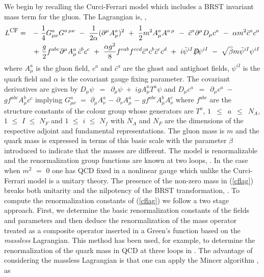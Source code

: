\documentclass[a4paper,11pt]{article}
\newcommand{\Dslash}{D \! \! \! \! /}
\newcommand{\Nf}{N_{\!f}}
\begin{document}
We begin by recalling the Curci-Ferrari model which includes a BRST invariant
mass term for the gluon. The Lagrangian is, \cite{17},  
\begin{eqnarray} 
L^{\mbox{\footnotesize{CF}}} &=& -~ \frac{1}{4} G_{\mu\nu}^a 
G^{a \, \mu\nu} ~-~ \frac{1}{2\alpha} (\partial^\mu A^a_\mu)^2 ~+~ 
\frac{1}{2} m^2 A_\mu^a A^{a \, \mu} ~-~ \bar{c}^a \partial^\mu D_\mu c^a ~-~ 
\alpha m^2 \bar{c}^a c^a \nonumber \\
&& +~ \frac{g}{2} f^{abc} \partial^\mu A^a_\mu \, \bar{c}^b c^c ~+~ 
\frac{\alpha g^2}{8} f^{eab} f^{ecd} \bar{c}^a c^b \bar{c}^c c^d ~+~ 
i \bar{\psi}^{iI} \Dslash \psi^{iI} ~-~ \sqrt{\beta} m \bar{\psi}^{iI} 
\psi^{iI} 
\label{cflag} 
\end{eqnarray}  
where $A^a_\mu$ is the gluon field, $c^a$ and $\bar{c}^a$ are the ghost and 
antighost fields, $\psi^{iI}$ is the quark field and $\alpha$ is the covariant 
gauge fixing parameter. The covariant derivatives are given by 
$D_\mu \psi$~$=$~$\partial_\mu \psi$~$+$~$ig A^a_\mu T^a \psi$ and 
$D_\mu c^a$~$=$~$\partial_\mu c^a$~$-$~$g f^{abc} A^b_\mu c^c$ implying 
$G^a_{\mu\nu}$ $=$ $\partial_\mu A^a_\nu$ $-$ $\partial_\nu A^a_\mu$ $-$ 
$g f^{abc} A^b_\mu A^c_\nu$ where $f^{abc}$ are the structure constants of the
colour group whose generators are $T^a$, $1$~$\leq$~$a$~$\leq$~$N_A$, 
$1$ $\leq$ $I$ $\leq$ $N_F$ and $1$ $\leq$ $i$ $\leq$ $\Nf$ with $N_A$ and 
$N_F$ are the dimensions of the respective adjoint and fundamental 
representations. The gluon mass is $m$ and the quark mass is expressed in terms
of this basic scale with the parameter $\beta$ introduced to indicate that the 
masses are different. The model is renormalizable and the renormalization group
functions are known at two loops, \cite{28,29}. In the case when $m^2$ $=$ $0$ 
one has QCD fixed in a nonlinear gauge which unlike the Curci-Ferrari model is 
a unitary theory. The presence of the non-zero mass in (\ref{cflag}) breaks 
both unitarity and the nilpotency of the BRST transformation, 
\cite{18,19,20,21,22,23,24,25}. To compute the renormalization constants of 
(\ref{cflag}) we follow a two stage approach. First, we determine the basic 
renormalization constants of the fields and parameters and then deduce the 
renormalization of the mass operator treated as a composite operator inserted 
in a Green's function based on the {\em massless} Lagrangian. This method has 
been used, for example, to determine the renormalization of the quark mass in 
QCD at three loops in \cite{30,31}. The advantage of considering the massless 
Lagrangian is that one can apply the {\sc Mincer} algorithm \cite{32}, as 
\end{document}
